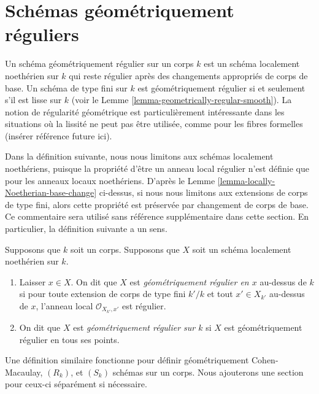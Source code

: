 \section{Schémas géométriquement réguliers}
\label{section-geometrically-regular}

\noindent
Un schéma géométriquement régulier sur un corps $k$ est un schéma
localement noethérien sur $k$ qui reste régulier après des changements
appropriés de corps de base. Un schéma de type fini sur $k$ est
géométriquement régulier si et seulement s'il est lisse sur $k$ (voir le Lemme
\ref{lemma-geometrically-regular-smooth}). La notion de régularité géométrique
est particulièrement intéressante dans les situations où la lissité ne peut pas
être utilisée, comme pour les fibres formelles (insérer référence future ici).

\medskip\noindent
Dans la définition suivante, nous nous limitons aux schémas
localement noethériens, puisque la propriété d'être un anneau
local régulier n'est définie que pour les anneaux locaux
noethériens. D'après le Lemme
\ref{lemma-locally-Noetherian-base-change} ci-dessus, si nous nous limitons
aux extensions de corps de type fini, alors cette propriété est préservée par
changement de corps de base. Ce commentaire sera utilisé sans référence
supplémentaire dans cette section. En particulier, la définition suivante a un sens.

\begin{definition}
\label{definition-geometrically-regular}
Supposons que $k$ soit un corps. Supposons que $X$ soit un schéma localement noethérien sur $k$.
\begin{enumerate}
\item Laisser $x \in X$. On dit que $X$ est {\it
géométriquement régulier en $x$ } au-dessus de $k$ si pour toute
extension de corps de type fini $k'/k$ et tout $x' \in X_{k'}$
au-dessus de $x$, l'anneau local $\mathcal{O}_{X_{k'}, x'}$ est
régulier. \item On dit que $X$ est {\it géométriquement régulier
sur $k$ } si $X$ est géométriquement régulier en tous ses points.
\end{enumerate}
\end{definition}

\noindent
Une définition similaire fonctionne pour définir
géométriquement Cohen-Macaulay, $(R_k)$, et $(S_k)$ schémas sur un
corps. Nous ajouterons une section pour ceux-ci séparément si nécessaire.

